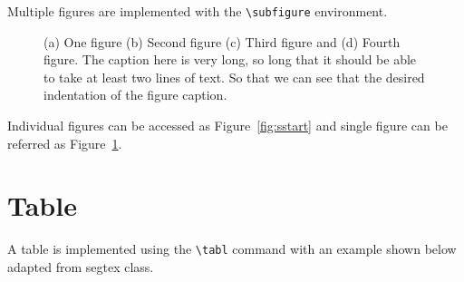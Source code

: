 \documentclass{edger}
\begin{document}
Multiple figures are implemented with the \verb|\subfigure| environment. 
\begin{figure}
	\centering
	\begin{subfigure}[c]{0.495\textwidth}
	\end{subfigure}
	\begin{subfigure}[c]{0.495\textwidth}
	\end{subfigure}
	\begin{subfigure}[c]{0.495\textwidth}
	\end{subfigure}
	\begin{subfigure}[c]{0.495\textwidth}
	\end{subfigure}
\caption{(a) One figure (b) Second figure (c) Third figure and (d) Fourth figure. The caption here  is very long, so long that it should be able to take at least two lines of text. So that we can see that the desired indentation of the figure caption.}	
\label{fig:bigfig}
\end{figure}


Individual figures can be accessed as Figure~\ref{fig:sstart} and single figure can be referred as Figure~\ref{fig:bigfig}.

\lipsum[1-7]  
\section*{Table}
A table is implemented using the \verb|\tabl| command with an example shown below adapted from segtex class.
\end{document}

